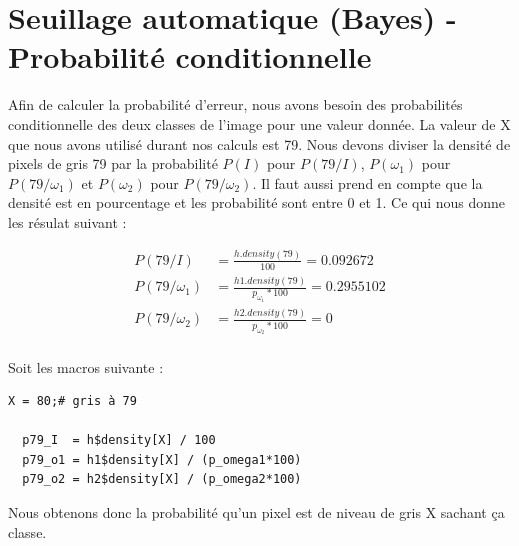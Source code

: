 \documentclass[a4paper,11pt]{article}
\begin{document}
  \section{Seuillage automatique (Bayes) - Probabilité conditionnelle}
  Afin de calculer la probabilité d'erreur, nous avons besoin des probabilités conditionnelle des deux
  classes de l'image pour une valeur donnée. La valeur de X que nous avons utilisé durant nos calculs
  est 79. Nous devons diviser la densité de pixels de gris 79 par la probabilité $P(I)$ pour $P(79/I)$, 
  $P(\omega_1)$ pour $P(79/\omega_1)$ et $P(\omega_2)$ pour $P(79/\omega_2)$. Il faut aussi prend en compte
  que la densité est en pourcentage et les probabilité sont entre 0 et 1. Ce qui nous donne les résulat suivant :
  
  \begin{align*}
    P(79/I) &= \frac{h.density(79)}{100} = 0.092672 \\
    P(79/\omega_1) &= \frac{ h1.density(79) }{ p_{\omega_{1}}*100 } = 0.2955102 \\
    P(79/\omega_2) &= \frac{ h2.density(79) }{ p_{\omega_{2}}*100 } = 0 \\
  \end{align*}
  
  
  
  Soit les macros suivante : \\
  
  \begin{lstlisting}[caption=Macros de calcule de probabilités conditionnelles]
  X = 80;# gris à 79

  p79_I  = h$density[X] / 100
  p79_o1 = h1$density[X] / (p_omega1*100)
  p79_o2 = h2$density[X] / (p_omega2*100)\end{lstlisting}
  
  Nous obtenons donc la probabilité qu'un pixel est de niveau de gris X sachant ça classe.
  
\end{document}
